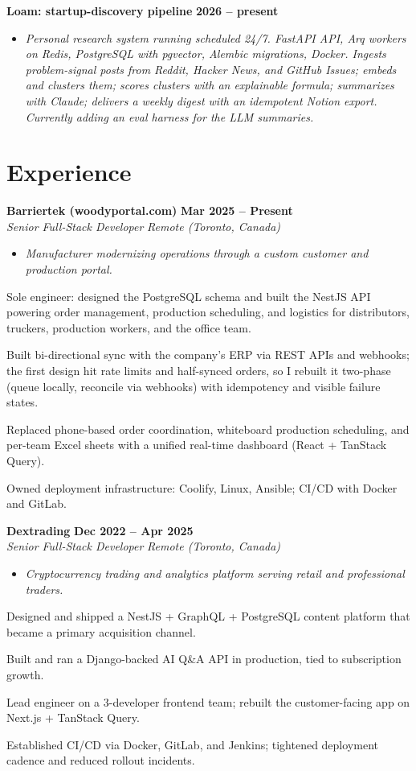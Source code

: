 \documentclass[letterpaper,10pt]{article}
\newcommand{\heading}[2]{
  \hspace{10pt}#1\hfill#2\\
}
\newcommand{\headingBf}[2]{
  \heading{\textbf{#1}}{\textbf{#2}}
}
\newcommand{\headingIt}[2]{
  \heading{\textit{#1}}{\textit{#2}}
}
\newenvironment{resume_list}{
  \vspace{-7pt}
  \begin{itemize}[itemsep=-2px, parsep=1pt, leftmargin=30pt]
}{
  \end{itemize}
  \vspace{1pt}
}
\newcommand{\companyDescription}[1]{
  \vspace{-7pt}
  \begin{itemize}[itemsep=-2px, parsep=1pt, leftmargin=12pt]
    \item[] {\color{textMuted}\textit{#1}}
  \end{itemize}
  \vspace{-4pt}
}
\begin{document}
  \headingBf{ Loam: startup-discovery pipeline }{ 2026 -- present }
  \companyDescription{ Personal research system running scheduled 24/7. FastAPI API, Arq workers on Redis, PostgreSQL with pgvector, Alembic migrations, Docker. Ingests problem-signal posts from Reddit, Hacker News, and GitHub Issues; embeds and clusters them; scores clusters with an explainable formula; summarizes with Claude; delivers a weekly digest with an idempotent Notion export. Currently adding an eval harness for the LLM summaries. }

  \section{Experience}

  \headingBf{ Barriertek (woodyportal.com) }{ Mar 2025 -- Present }
  \headingIt{ Senior Full-Stack Developer }{ Remote (Toronto, Canada) }
  \companyDescription{ Manufacturer modernizing operations through a custom customer and production portal. }
  \begin{resume_list}
    \item Sole engineer: designed the PostgreSQL schema and built the NestJS API powering order management, production scheduling, and logistics for distributors, truckers, production workers, and the office team.
    \item Built bi-directional sync with the company's ERP via REST APIs and webhooks; the first design hit rate limits and half-synced orders, so I rebuilt it two-phase (queue locally, reconcile via webhooks) with idempotency and visible failure states.
    \item Replaced phone-based order coordination, whiteboard production scheduling, and per-team Excel sheets with a unified real-time dashboard (React + TanStack Query).
    \item Owned deployment infrastructure: Coolify, Linux, Ansible; CI/CD with Docker and GitLab.
  \end{resume_list}

  \headingBf{ Dextrading }{ Dec 2022 -- Apr 2025 }
  \headingIt{ Senior Full-Stack Developer }{ Remote (Toronto, Canada) }
  \companyDescription{ Cryptocurrency trading and analytics platform serving retail and professional traders. }
  \begin{resume_list}
    \item Designed and shipped a NestJS + GraphQL + PostgreSQL content platform that became a primary acquisition channel.
    \item Built and ran a Django-backed AI Q\&A API in production, tied to subscription growth.
    \item Lead engineer on a 3-developer frontend team; rebuilt the customer-facing app on Next.js + TanStack Query.
    \item Established CI/CD via Docker, GitLab, and Jenkins; tightened deployment cadence and reduced rollout incidents.
  \end{resume_list}
\end{document}
